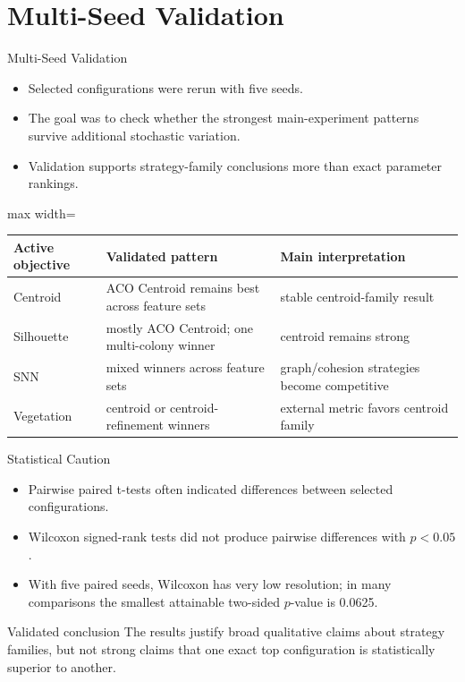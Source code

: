 \documentclass[aspectratio=169,10pt]{beamer}
\begin{document}
\section{Multi-Seed Validation}

\begin{frame}{Multi-Seed Validation}
  \begin{itemize}
    \item Selected configurations were rerun with five seeds.
    \item The goal was to check whether the strongest main-experiment patterns survive additional stochastic variation.
    \item Validation supports strategy-family conclusions more than exact parameter rankings.
  \end{itemize}

  \vspace{0.7em}
  \begin{adjustbox}{max width=\textwidth}
  \begin{tabular}{lll}
    \toprule
    Active objective & Validated pattern & Main interpretation \\
    \midrule
    Centroid & ACO Centroid remains best across feature sets & stable centroid-family result \\
    Silhouette & mostly ACO Centroid; one multi-colony winner & centroid remains strong \\
    SNN & mixed winners across feature sets & graph/cohesion strategies become competitive \\
    Vegetation & centroid or centroid-refinement winners & external metric favors centroid family \\
    \bottomrule
  \end{tabular}
  \end{adjustbox}
\end{frame}

\begin{frame}{Statistical Caution}
  \begin{itemize}
    \item Pairwise paired t-tests often indicated differences between selected configurations.
    \item Wilcoxon signed-rank tests did not produce pairwise differences with \(p<0.05\).
    \item With five paired seeds, Wilcoxon has very low resolution; in many comparisons the smallest attainable two-sided \(p\)-value is 0.0625.
  \end{itemize}

  \vspace{1em}
  \begin{block}{Validated conclusion}
    The results justify broad qualitative claims about strategy families, but not strong claims that one exact top configuration is statistically superior to another.
  \end{block}
\end{frame}
\end{document}
